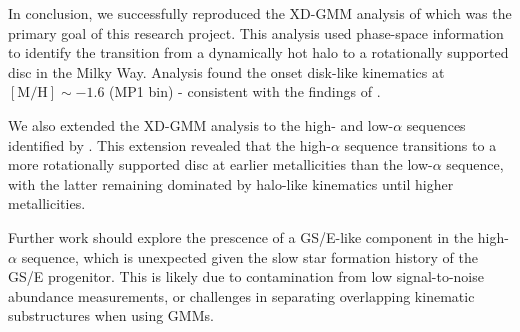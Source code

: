 \documentclass[a4paper,12pt]{article}
\begin{document}
In conclusion, we successfully reproduced the XD-GMM analysis of \citet{zhang2024existencemetalpoordiscmilky}
which was the primary goal of this research project. This analysis used phase-space information
to identify the transition from a dynamically hot halo to a rotationally supported disc in the Milky Way.
Analysis found the onset disk-like kinematics at $[\mathrm{M/H}]\sim-1.6$ (MP1 bin) - consistent with the
findings of \citet{zhang2024existencemetalpoordiscmilky}.

We also extended the XD-GMM analysis to the high- and low-$\alpha$ sequences identified by \citet{Vis2024}.
This extension revealed that the high-$\alpha$ sequence transitions to a more rotationally supported disc at
earlier metallicities than the low-$\alpha$ sequence, with the latter remaining dominated by halo-like
kinematics until higher metallicities.

Further work should explore the prescence of a GS/E-like component in the high-$\alpha$ sequence,
which is unexpected given the slow star formation history of the GS/E progenitor. This is likely due 
to contamination from low signal-to-noise abundance measurements, or challenges in separating 
overlapping kinematic substructures when using GMMs. 





\newpage


\end{document}
